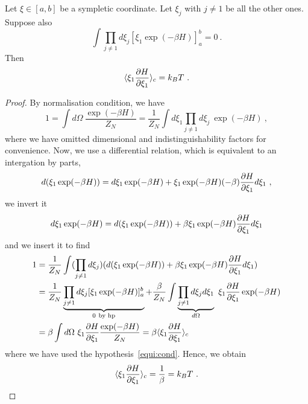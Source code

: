    \begin{theorem}
        Let $\xi \in [a,b]$ be a sympletic coordinate. Let $\xi_j$ with $j \neq 1$ be all the other ones. Suppose also 
        \begin{equation}\label{equi:cond}
            \int \prod_{j \neq 1} d \xi_j [\xi_1 \exp(-\beta H)]_a^b = 0 ~.
        \end{equation}
        Then 
        \begin{equation}\label{equi:thm}
            \langle\xi_1 \frac{\partial H}{\partial\xi_1}\rangle_{c} = k_B T ~.
        \end{equation}
    \end{theorem}

    \begin{proof}
        By normalisation condition, we have
        \begin{equation*}
            1 = \int d\Omega ~ \frac{\exp(-\beta H)}{Z_N} = \frac{1}{Z_N} \int d\xi_1 \prod_{j \neq 1} d \xi_j ~ \exp(-\beta H) ~,
        \end{equation*}
        where we have omitted dimensional and indistinguishability factors for convenience.
        Now, we use a differential relation, which is equivalent to an intergation by parts,
        \begin{equation*}
            d(\xi_1 \exp(-\beta H)) = d\xi_1 \exp(-\beta H) + \xi_1 \exp(-\beta H) (-\beta) \frac{\partial H}{\partial\xi_1} d\xi_1  ~,
        \end{equation*}
        we invert it 
        \begin{equation*}
            d\xi_1 \exp(-\beta H) = d(\xi_1 \exp(-\beta H)) + \beta \xi_1 \exp(-\beta H) \frac{\partial H}{\partial\xi_1} d\xi_1
        \end{equation*}
        and we insert it to find
        \begin{equation*}
        \begin{aligned}        
            1 & = \frac{1}{Z_N} \int (\prod_{j \neq 1} d \xi_j) (d(\xi_1 \exp(-\beta H)) + \beta \xi_1 \exp(-\beta H) \frac{\partial H}{\partial\xi_1} d\xi_1) \\ & = \frac{1}{Z_N} \underbrace{\prod_{j \neq 1} d \xi_j [\xi_1 \exp(-\beta H)]_a^b}_{0~\text{by hp}} + \frac{\beta}{Z_N} \int \underbrace{\prod_{j \neq 1} d \xi_j d\xi_1}_{d\Omega} ~ \xi_1 \frac{\partial H}{\partial\xi_1} \exp (-\beta H) \\ & = \beta \int d\Omega ~ \xi_1 \frac{\partial H}{\partial\xi_1} \frac{\exp (- \beta H)}{Z_N} = \beta \langle\xi_1 \frac{\partial H}{\partial\xi_1}\rangle_{c}
        \end{aligned}
        \end{equation*}
        where we have used the hypothesis~\eqref{equi:cond}.
        Hence, we obtain
        \begin{equation*}
            \langle\xi_1 \frac{\partial H}{\partial\xi_1}\rangle_{c} = \frac{1}{\beta} = k_B T ~.
        \end{equation*}
    \end{proof}

